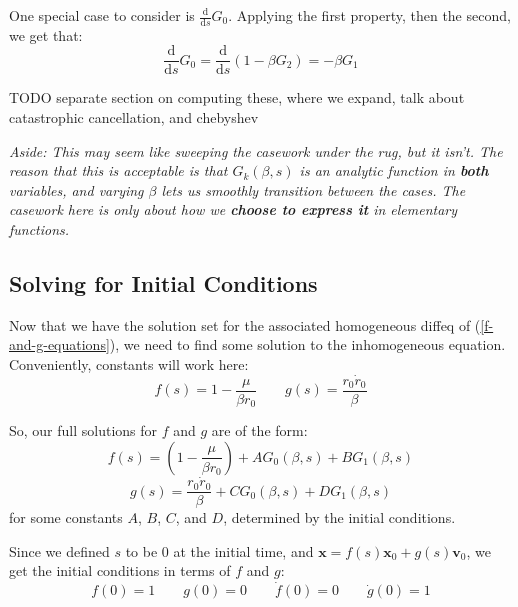 \documentclass{article}
\newcommand{\dd}{\mathrm{d}}
\newcommand{\der}[2]{\frac{\dd #1}{\dd #2}}
\numberwithin{equation}{subsection}
\begin{document}
One special case to consider is $\der{}{s} G_0$. Applying the first property, then the second, we get that:
\begin{equation*}
\der{}{s} G_0 = \der{}{s} (1 - \beta G_2) = - \beta G_1
\end{equation*}



TODO separate section on computing these, where we expand, talk about catastrophic cancellation, and chebyshev

\textit{Aside: This may seem like sweeping the casework under the rug, but it isn't. The reason that this is acceptable is that $G_k(\beta, s)$ is an analytic function in \textbf{both} variables, and varying $\beta$ lets us smoothly transition between the cases. The casework here is only about how we \textbf{choose to express it} in elementary functions.}


\subsection{Solving for Initial Conditions}

Now that we have the solution set for the associated homogeneous diffeq of (\ref{f-and-g-equations}), we need to find some solution to the inhomogeneous equation. Conveniently, constants will work here:
\begin{equation}
f(s) = 1 - \frac{\mu}{\beta r_0}  \qquad  g(s) = \frac{r_0 \dot{r}_0}{\beta}
\end{equation}

So, our full solutions for $f$ and $g$ are of the form:
\begin{equation}
\label{general-solution-f}
f(s) = \left(1 - \frac{\mu}{\beta r_0}\right) + A G_0(\beta, s) + B G_1(\beta, s)
\end{equation}
\begin{equation}
\label{general-solution-g}
g(s) = \frac{r_0 \dot{r}_0}{\beta} + C G_0(\beta, s) + D G_1(\beta, s)
\end{equation}
for some constants $A$, $B$, $C$, and $D$, determined by the initial conditions.

Since we defined $s$ to be $0$ at the initial time, and $\bm x = f(s) \bm x_0 + g(s) \bm v_0$, we get the initial conditions in terms of $f$ and $g$:
\begin{equation}
f(0) = 1 \qquad g(0) = 0 \qquad \dot{f}(0) = 0 \qquad \dot{g}(0) = 1
\end{equation}
\end{document}
